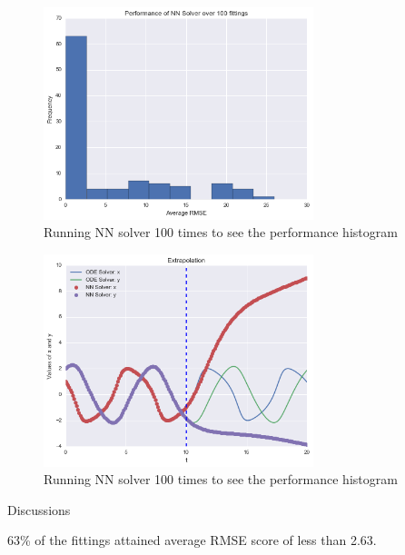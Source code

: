 \documentclass[11pt]{article}
\begin{document}
\begin{figure}
\centering
\includegraphics[width=0.7\textwidth]{VDP_DIst.png}
      \caption{Running NN solver 100 times to see the performance histogram \label{fig:VDP_perf_dist}}
\end{figure}

\begin{figure}
\centering
\includegraphics[width=0.7\textwidth]{extrapo_VDP.png}
      \caption{Running NN solver 100 times to see the performance histogram \label{fig:VDP_extrapo}}
\end{figure}


Discussions

63\% of the fittings attained average RMSE score of less than 2.63.


\end{document}

